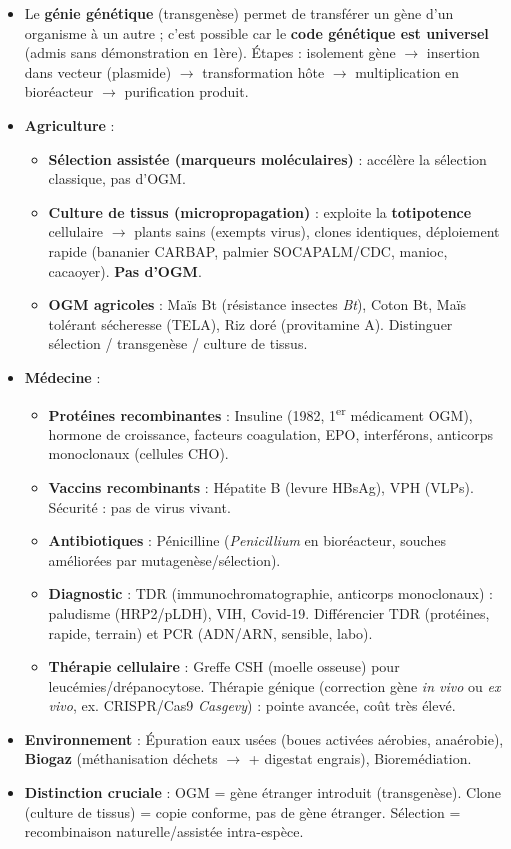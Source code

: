 \documentclass[11pt]{article}
\begin{document}
\begin{aretenir}
\begin{itemize}
\item Le \textbf{génie génétique} (transgenèse) permet de transférer un gène d'un organisme à un autre ; c'est possible car le \textbf{code génétique est universel} (admis sans démonstration en 1ère). Étapes : isolement gène $\to$ insertion dans vecteur (plasmide) $\to$ transformation hôte $\to$ multiplication en bioréacteur $\to$ purification produit.
\item \textbf{Agriculture} :
      \begin{itemize}
      \item \textbf{Sélection assistée (marqueurs moléculaires)} : accélère la sélection classique, pas d'OGM.
      \item \textbf{Culture de tissus (micropropagation)} : exploite la \textbf{totipotence} cellulaire $\to$ plants sains (exempts virus), clones identiques, déploiement rapide (bananier CARBAP, palmier SOCAPALM/CDC, manioc, cacaoyer). \textbf{Pas d'OGM}.
      \item \textbf{OGM agricoles} : Maïs Bt (résistance insectes \emph{Bt}), Coton Bt, Maïs tolérant sécheresse (TELA), Riz doré (provitamine A). Distinguer sélection / transgenèse / culture de tissus.
      \end{itemize}
\item \textbf{Médecine} :
      \begin{itemize}
      \item \textbf{Protéines recombinantes} : Insuline (1982, 1\textsuperscript{er} médicament OGM), hormone de croissance, facteurs coagulation, EPO, interférons, anticorps monoclonaux (cellules CHO).
      \item \textbf{Vaccins recombinants} : Hépatite B (levure HBsAg), VPH (VLPs). Sécurité : pas de virus vivant.
      \item \textbf{Antibiotiques} : Pénicilline (\emph{Penicillium} en bioréacteur, souches améliorées par mutagenèse/sélection).
      \item \textbf{Diagnostic} : TDR (immunochromatographie, anticorps monoclonaux) : paludisme (HRP2/pLDH), VIH, Covid-19. Différencier TDR (protéines, rapide, terrain) et PCR (ADN/ARN, sensible, labo).
      \item \textbf{Thérapie cellulaire} : Greffe CSH (moelle osseuse) pour leucémies/drépanocytose. Thérapie génique (correction gène \emph{in vivo} ou \emph{ex vivo}, ex. CRISPR/Cas9 \emph{Casgevy}) : pointe avancée, coût très élevé.
      \end{itemize}
\item \textbf{Environnement} : Épuration eaux usées (boues activées aérobies, anaérobie), \textbf{Biogaz} (méthanisation déchets $\to$  + digestat engrais), Bioremédiation.
\item \textbf{Distinction cruciale} : OGM = gène étranger introduit (transgenèse). Clone (culture de tissus) = copie conforme, pas de gène étranger. Sélection = recombinaison naturelle/assistée intra-espèce.
\end{itemize}
\end{aretenir}
\end{document}
